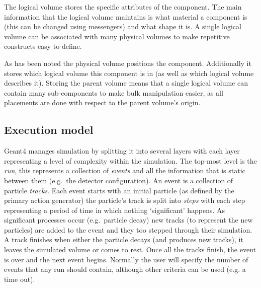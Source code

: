 The logical volume stores the specific attributes of the component. The main information that the logical volume maintains is what material a component is (this can be changed using messengers) and what shape it is. A single logical volume can be associated with many physical volumes to make repetitive constructs easy to define.

As has been noted the physical volume positions the component. Additionally it stores which logical volume this component is in (as well as which logical volume describes it). Storing the parent volume means that a single logical volume can contain many sub-components to make bulk manipulation easier, as all placements are done with respect to the parent volume's origin.

\subsection{Execution model} %
\label{sub:execution_model}

Geant4 manages simulation by splitting it into several layers with each layer representing a level of complexity within the simulation. The top-most level is the \emph{run}, this represents a collection of \emph{events} and all the information that is static between them (e.g.\ the detector configuration). An event is a collection of particle \emph{tracks}. Each event starts with an initial particle (as defined by the primary action generator) the particle's track is split into \emph{steps} with each step representing a period of time in which nothing `significant' happens. As significant processes occur (e.g.\ particle decay) new tracks (to represent the new particles) are added to the event and they too stepped through their simulation. A track finishes when either the particle decays (and produces new tracks), it leaves the simulated volume or comes to rest. Once all the tracks finish, the event is over and the next event begins. Normally the user will specify the number of events that any run should contain, although other criteria can be used (e.g. a time out).

